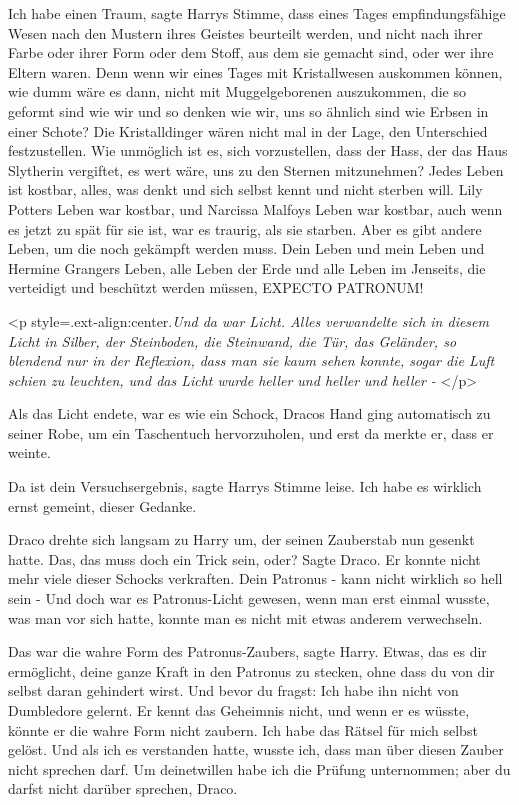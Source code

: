 \glqq{}Ich habe einen Traum\grqq{}, sagte Harrys Stimme, \glqq{}dass eines Tages
empfindungsfähige Wesen nach den Mustern ihres Geistes beurteilt werden, und
nicht nach ihrer Farbe oder ihrer Form oder dem Stoff, aus dem sie gemacht sind,
oder wer ihre Eltern waren. Denn wenn wir eines Tages mit Kristallwesen
auskommen können, wie dumm wäre es dann, nicht mit Muggelgeborenen auszukommen,
die so geformt sind wie wir und so denken wie wir, uns so ähnlich sind wie
Erbsen in einer Schote? Die Kristalldinger wären nicht mal in der Lage, den
Unterschied festzustellen. Wie unmöglich ist es, sich vorzustellen, dass der
Hass, der das Haus Slytherin vergiftet, es wert wäre, uns zu den Sternen
mitzunehmen? Jedes Leben ist kostbar, alles, was denkt und sich selbst kennt und
nicht sterben will. Lily Potters Leben war kostbar, und Narcissa Malfoys Leben
war kostbar, auch wenn es jetzt zu spät für sie ist, war es traurig, als sie
starben. Aber es gibt andere Leben, um die noch gekämpft werden muss. Dein Leben
und mein Leben und Hermine Grangers Leben, alle Leben der Erde und alle Leben im
Jenseits, die verteidigt und beschützt werden müssen, EXPECTO PATRONUM!\grqq{}

<p style=\grqq{}.ext-align:center\grqq{}.\emph{Und da war Licht. Alles
verwandelte sich in diesem Licht in Silber, der Steinboden, die Steinwand, die
Tür, das Geländer, so blendend nur in der Reflexion, dass man sie kaum sehen
konnte, sogar die Luft schien zu leuchten, und das Licht wurde heller und heller
und heller -} </p>

Als das Licht endete, war es wie ein Schock, Dracos Hand ging automatisch zu
seiner Robe, um ein Taschentuch hervorzuholen, und erst da merkte er, dass er
weinte.

\glqq{}Da ist dein Versuchsergebnis\grqq{}, sagte Harrys Stimme leise. \glqq{}Ich
habe es wirklich ernst gemeint, dieser Gedanke.\grqq{}

Draco drehte sich langsam zu Harry um, der seinen Zauberstab nun gesenkt hatte.
\glqq{}Das, das muss doch ein Trick sein, oder?\grqq{} Sagte Draco. Er konnte
nicht mehr viele dieser Schocks verkraften. \glqq{}Dein Patronus - kann nicht
wirklich so hell sein -\grqq{} Und doch war es Patronus-Licht gewesen, wenn man
erst einmal wusste, was man vor sich hatte, konnte man es nicht mit etwas
anderem verwechseln.

\glqq{}Das war die wahre Form des Patronus-Zaubers\grqq{}, sagte Harry. \glqq
Etwas, das es dir ermöglicht, deine ganze Kraft in den Patronus zu stecken, ohne
dass du von dir selbst daran gehindert wirst. Und bevor du fragst: Ich habe ihn
nicht von Dumbledore gelernt. Er kennt das Geheimnis nicht, und wenn er es
wüsste, könnte er die wahre Form nicht zaubern. Ich habe das Rätsel für mich
selbst gelöst. Und als ich es verstanden hatte, wusste ich, dass man über diesen
Zauber nicht sprechen darf. Um deinetwillen habe ich die Prüfung unternommen;
aber du darfst nicht darüber sprechen, Draco.\grqq{}

